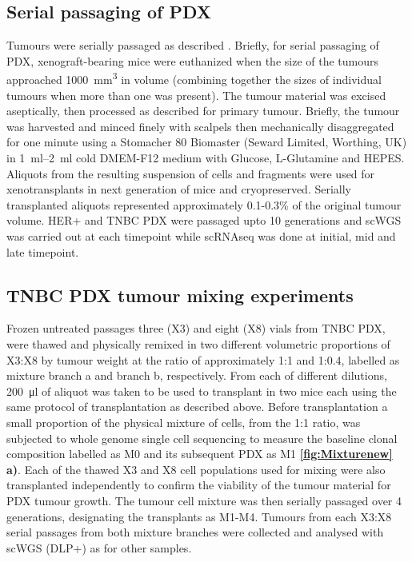 \subsection{Serial passaging of PDX}
Tumours were serially passaged as  described \cite{eirew2015dynamics}.
Briefly, for serial passaging of PDX, xenograft-bearing mice were euthanized when the size of the tumours approached \SI{1000}{\mm\cubed} in volume (combining together the sizes of individual tumours when more than one was present).
The tumour material was excised aseptically, then processed as described for primary tumour. 
Briefly, the tumour was harvested and minced finely with scalpels then mechanically disaggregated for one minute using a Stomacher 80 Biomaster (Seward Limited, Worthing, UK) in \SIrange{1}{2}{\ml} cold DMEM-F12 medium with Glucose, L-Glutamine and HEPES. 
Aliquots from the resulting suspension of cells and fragments were used for xenotransplants in next generation of mice and cryopreserved.
Serially transplanted aliquots represented approximately 0.1-0.3\%  of the original tumour volume. HER+ and TNBC PDX were passaged upto 10 generations and scWGS was carried out at each timepoint while scRNAseq was done at initial, mid and late timepoint. 

\subsection{TNBC PDX tumour mixing experiments} Frozen untreated passages three (X3) and eight (X8) vials from TNBC PDX, were thawed and  physically remixed in two different volumetric proportions of X3:X8 by tumour weight at the ratio of approximately 1:1 and 1:0.4, labelled as mixture branch a and branch b, respectively. From each of different dilutions, \SI{200}{\ul} of aliquot was taken to be used to transplant in two mice each using the same protocol of transplantation as described above. Before transplantation a small proportion of the physical mixture of cells, from the 1:1 ratio, was subjected to whole genome single cell sequencing to measure the baseline clonal composition labelled as M0 and its subsequent PDX as M1 \textbf{\autoref{fig:Mixturenew} a)}. Each of the thawed X3 and X8 cell populations used for mixing were also transplanted independently to confirm the viability of the tumour material for PDX tumour growth. The tumour cell mixture was then serially passaged over 4 generations, designating the transplants as M1-M4. Tumours from each X3:X8 serial passages from both mixture branches were collected and analysed with scWGS (DLP+) as for other samples.


